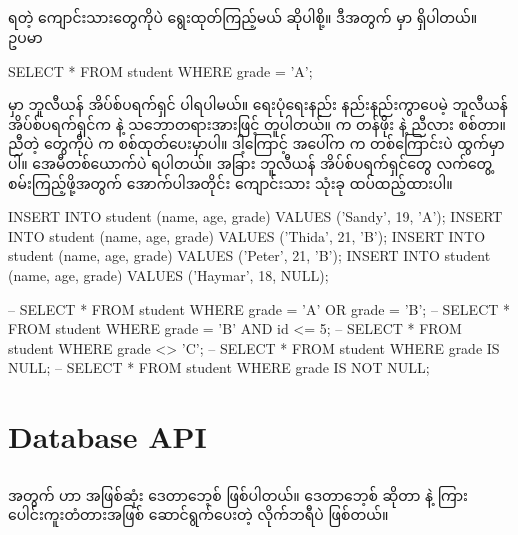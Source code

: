 \subsection*{}
 ရတဲ့ ကျောင်းသားတွေကိုပဲ ရွေးထုတ်ကြည့်မယ် ဆိုပါစို့။ ဒီအတွက်  မှာ  ရှိပါတယ်။ ဥပမာ
%
\begin{sql}
SELECT * FROM student WHERE grade = 'A';
\end{sql}
%
 မှာ ဘူလီယန် အိပ်စ်ပရက်ရှင် ပါရပါမယ်။ ရေးပုံရေးနည်း နည်းနည်းကွာပေမဲ့  ဘူလီယန် အိပ်စ်ပရက်ရှင်က  နဲ့ သဘောတရားအားဖြင့် တူပါတယ်။  က   တန်ဖိုး  နဲ့ ညီလား စစ်တာ။ ညီတဲ့  တွေကိုပဲ  က စစ်ထုတ်ပေးမှာပါ။ ဒါ့ကြောင့် အပေါ်က  က  တစ်ကြောင်းပဲ ထွက်မှာပါ။ အေမီတစ်ယောက်ပဲ  ရပါတယ်။ အခြား ဘူလီယန် အိပ်စ်ပရက်ရှင်တွေ လက်တွေ့စမ်းကြည့်ဖို့အတွက် အောက်ပါအတိုင်း ကျောင်းသား  သုံးခု ထပ်ထည့်ထားပါ။  
%
\begin{sql}
INSERT INTO student (name, age, grade) VALUES ('Sandy', 19, 'A');
INSERT INTO student (name, age, grade) VALUES ('Thida', 21, 'B');
INSERT INTO student (name, age, grade) VALUES ('Peter', 21, 'B');
INSERT INTO student (name, age, grade) VALUES ('Haymar', 18, NULL);
\end{sql}
%

%
\begin{sql}
-- 
SELECT * FROM student WHERE grade = 'A' OR grade = 'B';
--
SELECT * FROM student WHERE grade = 'B' AND id <= 5;
--
SELECT * FROM student WHERE grade <> 'C';
--
SELECT * FROM student WHERE grade IS NULL;
--
SELECT * FROM student WHERE grade IS NOT NULL;
\end{sql}
%

\subsection*{}


\subsection*{}

  

\section{Database API}

\subsection*{}
 အတွက်  ဟာ  အဖြစ်ဆုံး   ဒေတာဘေ့စ်  ဖြစ်ပါတယ်။ ဒေတာဘေ့စ်  ဆိုတာ  နဲ့  ကြား ပေါင်းကူးတံတားအဖြစ် ဆောင်ရွက်ပေးတဲ့ လိုက်ဘရီပဲ ဖြစ်တယ်။

